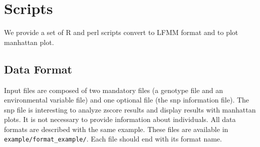 \documentclass[10pt,a4paper]{article}
\begin{document}
\section{Scripts}

We provide a set of R and perl scripts convert to LFMM format and to plot manhattan plot.

\subsection{Data Format}
Input files are composed of two mandatory files (a genotype file and an environmental variable file)
and one optional file (the snp information file). The snp file is interesting to analyze zscore
results and display results with manhattan plots.
It is not necessary to provide information about individuals.
All data formats are described with the same
example. These files are available in \verb|example/format_example/|.
Each file should end with its format name.
\end{document}
